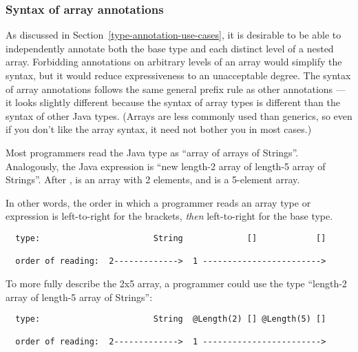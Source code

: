 \documentclass[10pt]{article}
\begin{document}
\subsubsection{Syntax of array annotations\label{array-syntax}}

As discussed in Section~\ref{type-annotation-use-cases}, it is
desirable to be able to independently annotate both the base type and
each distinct level of a nested array.
Forbidding annotations on arbitrary levels of an array would simplify the
syntax, but it would reduce expressiveness to an unacceptable degree.
The syntax of array annotations follows the same general prefix rule as
other annotations --- it looks slightly different because the syntax
of array types is different than the syntax of other Java types.
(Arrays are less commonly used than generics, so even if you don't like the
array syntax, it need not bother you in most cases.)

Most programmers read the Java type  as
``array of arrays of Strings''.  Analogously, the Java expression
 is ``new length-2 array of length-5 array of Strings''.
After ,  is an array with
2 elements, and  is a 5-element array.

In other words, the order in which a programmer reads an array type or
expression is left-to-right for the
brackets, \emph{then} left-to-right for the base type.

\begin{Verbatim}
  type:                       String             []            []

  order of reading:  2------------->  1 ------------------------>
\end{Verbatim}



To more fully describe the 2x5 array, a programmer could use the
type ``length-2 array of length-5 array of Strings'':

\begin{Verbatim}
  type:                       String  @Length(2) [] @Length(5) []

  order of reading:  2------------->  1 ------------------------>
\end{Verbatim}
\end{document}
